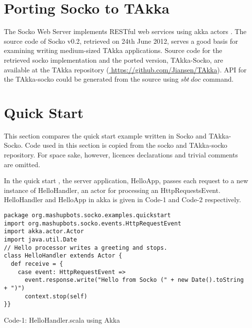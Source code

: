 \documentclass[11pt, a4paper]{article}
\begin{document}
\maketitle

\section{Porting Socko to TAkka}
The Socko Web Server \cite{sockoorg} implements RESTful web services \cite{RESTfulwiki} using akka actors \cite{akka}.  The source code of Socko v0.2, retrieved on 24th June 2012, serves a good basis for examining writing medium-sized TAkka applications.  Source code for the retrieved socko implementation and the ported version, TAkka-Socko, are available at the TAkka repository (\url{ https://github.com/Jiansen/TAkka}).  API for the TAkka-socko could be generated from the source using $sbt\ doc$ command.


\section{Quick Start}\label{changes}
This section compares the quick start example written in Socko and TAkka-Socko.  Code used in this section is copied from the socko and TAkka-socko repository.  For space sake, however, licences declarations and trivial comments are omitted.

In the quick start , the server application, HelloApp, passes each request to a new instance of HelloHandler, an actor for processing an HttpRequestsEvent.  HelloHandler and HelloApp in akka is given in Code-1 and Code-2 respectively.

\begin{lstlisting}
package org.mashupbots.socko.examples.quickstart
import org.mashupbots.socko.events.HttpRequestEvent
import akka.actor.Actor
import java.util.Date
// Hello processor writes a greeting and stops.
class HelloHandler extends Actor {
  def receive = {
    case event: HttpRequestEvent =>
      event.response.write("Hello from Socko (" + new Date().toString + ")")
      context.stop(self)
}}
\end{lstlisting}
\begin{center}Code-1: HelloHandler.scala using Akka\end{center}
\end{document}
